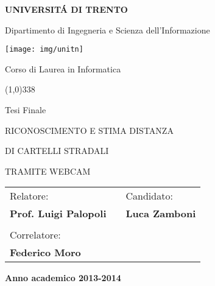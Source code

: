 
\pagestyle{empty}

\begin{center}
	{\bfseries\Large {\huge U}NIVERSIT\'A DI {\huge T}RENTO}

	\vspace{0.2cm}

	{\large Dipartimento di Ingegneria e Scienza dell'Informazione}

	\vspace{0.5cm}

	\begin{center}
		\texttt{[image: img/unitn]}
	\end{center}

	\vspace{0.5cm}

	{\Large Corso di Laurea in Informatica}

	\vspace{0.2cm}
	\line(1,0){338}
	\vspace{0.5cm}

	{\Large Tesi Finale}

	\vspace{1.5cm}

	{\Large {RICONOSCIMENTO E STIMA DISTANZA }}

	\vspace{0.2cm}

	{\Large {DI CARTELLI STRADALI}}

	\vspace{0.2cm}

	{\Large {TRAMITE WEBCAM}}

	\vspace{1.5cm}

	\large
	\begin{center}
		\begin{tabular}{lcl}
			Relatore: & \hspace{5cm} &  Candidato: \\
			{\bfseries Prof. Luigi Palopoli} & \hspace{5cm} & {\bfseries Luca Zamboni} \\ \\
			Correlatore: \\ {\bfseries Federico Moro}
		\end{tabular}
	\end{center}
	\vspace{2.0cm}

	{\large \bfseries Anno academico 2013-2014}
	\vfill

\end{center}
